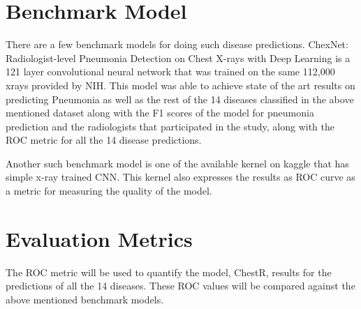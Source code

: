 \documentclass{article}
\begin{document}
    \section{Benchmark Model}
    There are a few benchmark models for doing such disease predictions. ChexNet: Radiologist-level Pneumonia Detection on Chest X-rays with Deep Learning\cite{chexnet} is a 121 layer convolutional neural network that was trained on the same 112,000 xrays provided by NIH. This model was able to achieve state of the art results on predicting Pneumonia as well as the rest of the 14 diseases classified in the above mentioned dataset along with the F1 scores of the model for pneumonia prediction and the radiologists that participated in the study, along with the ROC metric for all the 14 disease predictions.

    Another such benchmark model is one of the available kernel on kaggle that has simple x-ray trained CNN\cite{simple-xray-cnn}. This kernel also expresses the results as ROC curve as a metric for measuring the quality of the model.

    \section{Evaluation Metrics}
    The ROC metric will be used to quantify the model, ChestR, results for the predictions of all the 14 diseases. These ROC values will be compared against the above mentioned benchmark models.
\end{document}
